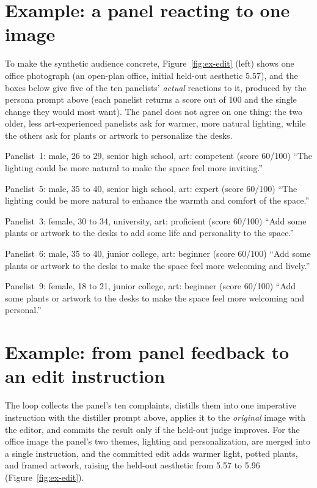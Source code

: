 \documentclass{article}
\begin{document}
\section{Example: a panel reacting to one image}
\label{sup:panel-example}
To make the synthetic audience concrete, Figure~\ref{fig:ex-edit} (left) shows one office photograph (an open-plan office, initial held-out aesthetic 5.57), and the boxes below give five of the ten panelists' \emph{actual} reactions to it, produced by the persona prompt above (each panelist returns a score out of 100 and the single change they would most want). The panel does not agree on one thing: the two older, less art-experienced panelists ask for warmer, more natural lighting, while the others ask for plants or artwork to personalize the desks.

\begin{personabox}{Panelist~1: male, 26 to 29, senior high school, art: competent \quad(score 60/100)}
\small ``The lighting could be more natural to make the space feel more inviting.''
\end{personabox}
\begin{personabox}{Panelist~5: male, 35 to 40, senior high school, art: expert \quad(score 60/100)}
\small ``The lighting could be more natural to enhance the warmth and comfort of the space.''
\end{personabox}
\begin{personabox}{Panelist~3: female, 30 to 34, university, art: proficient \quad(score 60/100)}
\small ``Add some plants or artwork to the desks to add some life and personality to the space.''
\end{personabox}
\begin{personabox}{Panelist~6: male, 35 to 40, junior college, art: beginner \quad(score 60/100)}
\small ``Add some plants or artwork to the desks to make the space feel more welcoming and lively.''
\end{personabox}
\begin{personabox}{Panelist~9: female, 18 to 21, junior college, art: beginner \quad(score 60/100)}
\small ``Add some plants or artwork to the desks to make the space feel more welcoming and personal.''
\end{personabox}

\section{Example: from panel feedback to an edit instruction}
\label{sup:aggregation}
The loop collects the panel's ten complaints, distills them into one imperative instruction with the distiller prompt above, applies it to the \emph{original} image with the editor, and commits the result only if the held-out judge improves. For the office image the panel's two themes, lighting and personalization, are merged into a single instruction, and the committed edit adds warmer light, potted plants, and framed artwork, raising the held-out aesthetic from 5.57 to 5.96 (Figure~\ref{fig:ex-edit}).
\end{document}
